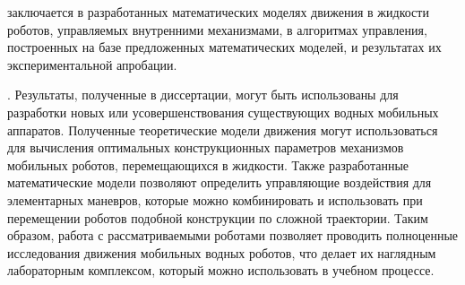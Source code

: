 {\novelty} заключается в разработанных математических моделях движения в жидкости роботов, управляемых внутренними механизмами, в алгоритмах управления, построенных на базе предложенных математических моделей, и результатах их экспериментальной апробации.

{\influence}. Результаты, полученные в диссертации, могут быть использованы для разработки новых или усовершенствования существующих водных мобильных аппаратов. Полученные теоретические модели движения могут использоваться для вычисления оптимальных конструкционных параметров механизмов мобильных роботов, перемещающихся в жидкости. Также разработанные математические модели позволяют определить управляющие воздействия для элементарных маневров, которые можно комбинировать и использовать при перемещении роботов подобной конструкции по сложной траектории. Таким образом, работа с рассматриваемыми роботами позволяет проводить полноценные исследования движения мобильных водных роботов, что делает их наглядным лабораторным комплексом, который можно использовать в учебном процессе.

